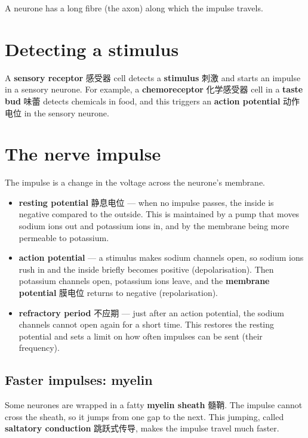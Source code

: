 \documentclass[11pt]{article}
\begin{document}
A neurone has a long fibre (the axon) along which the impulse travels.

\section*{Detecting a stimulus}

A \textbf{sensory receptor} 感受器 cell detects a \textbf{stimulus} 刺激 and starts an impulse in a sensory neurone. For example, a \textbf{chemoreceptor} 化学感受器 cell in a \textbf{taste bud} 味蕾 detects chemicals in food, and this triggers an \textbf{action potential} 动作电位 in the sensory neurone.

\section*{The nerve impulse}

The impulse is a change in the voltage across the neurone's membrane.

\begin{itemize}
\item \textbf{resting potential} 静息电位 — when no impulse passes, the inside is negative compared to the outside. This is maintained by a pump that moves sodium ions out and potassium ions in, and by the membrane being more permeable to potassium.

\item \textbf{action potential} — a stimulus makes sodium channels open, so sodium ions rush in and the inside briefly becomes positive (depolarisation). Then potassium channels open, potassium ions leave, and the \textbf{membrane potential} 膜电位 returns to negative (repolarisation).

\item \textbf{refractory period} 不应期 — just after an action potential, the sodium channels cannot open again for a short time. This restores the resting potential and sets a limit on how often impulses can be sent (their frequency).

\end{itemize}

\subsection*{Faster impulses: myelin}

Some neurones are wrapped in a fatty \textbf{myelin sheath} 髓鞘. The impulse cannot cross the sheath, so it jumps from one gap to the next. This jumping, called \textbf{saltatory conduction} 跳跃式传导, makes the impulse travel much faster.
\end{document}
